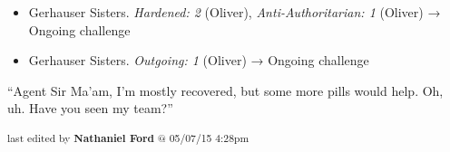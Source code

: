 


\begin{itemize}
\item Gerhauser Sisters. \textit{Hardened: 2} (Oliver), \textit{Anti-Authoritarian: 1} (Oliver) → Ongoing challenge
\item Gerhauser Sisters. \textit{Outgoing: 1} (Oliver) → Ongoing challenge
\end{itemize}






``Agent Sir Ma'am, I'm mostly recovered, but some more pills would help.  Oh, uh. Have you seen my team?''



\vspace{\fill}

\begin{flushright}
\textsubscript{last edited by \textbf{Nathaniel Ford} @ 05/07/15 4:28pm}
\end{flushright}


